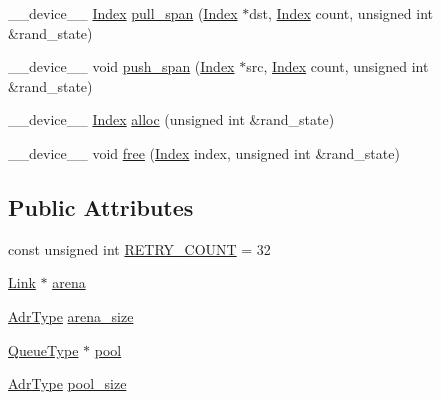 \begin{DoxyCompactItemize}
\-\_\-\-\_\-device\-\_\-\-\_\- \hyperlink{structMemPool_adf9fcd1cb44028899c45761a29b7d43f}{Index} \hyperlink{structMemPool_ac8e3fca0c4657642e06cba7e393c7be7}{pull\-\_\-span} (\hyperlink{structMemPool_adf9fcd1cb44028899c45761a29b7d43f}{Index} $\ast$dst, \hyperlink{structMemPool_adf9fcd1cb44028899c45761a29b7d43f}{Index} count, unsigned int \&rand\-\_\-state)
\item 
\-\_\-\-\_\-device\-\_\-\-\_\- void \hyperlink{structMemPool_acf1f6f80c1f7ebb2b50bb9d4af619abb}{push\-\_\-span} (\hyperlink{structMemPool_adf9fcd1cb44028899c45761a29b7d43f}{Index} $\ast$src, \hyperlink{structMemPool_adf9fcd1cb44028899c45761a29b7d43f}{Index} count, unsigned int \&rand\-\_\-state)
\item 
\-\_\-\-\_\-device\-\_\-\-\_\- \hyperlink{structMemPool_adf9fcd1cb44028899c45761a29b7d43f}{Index} \hyperlink{structMemPool_a1f02b879780bf1dff7ab3b86263824d4}{alloc} (unsigned int \&rand\-\_\-state)
\item 
\-\_\-\-\_\-device\-\_\-\-\_\- void \hyperlink{structMemPool_aca9a7fd23bcb95c111267683ffb17b35}{free} (\hyperlink{structMemPool_adf9fcd1cb44028899c45761a29b7d43f}{Index} index, unsigned int \&rand\-\_\-state)
\end{DoxyCompactItemize}
\subsection*{Public Attributes}
\begin{DoxyCompactItemize}
\item 
const unsigned int \hyperlink{structMemPool_a9f0113977dc6ebc1f99aeac36455d49d}{R\-E\-T\-R\-Y\-\_\-\-C\-O\-U\-N\-T} = 32
\item 
\hyperlink{unionMemPool_1_1Link}{Link} $\ast$ \hyperlink{structMemPool_affe7fe7c80536562358f79d4ff41a92b}{arena}
\item 
\hyperlink{structMemPool_a62addfe04ad9f092442cf86863f52fcc}{Adr\-Type} \hyperlink{structMemPool_a3bfcf6da58b80b102be1ec4f4f5b424a}{arena\-\_\-size}
\item 
\hyperlink{structMemPool_a6044c1fc80a16b30462127a56e47ab98}{Queue\-Type} $\ast$ \hyperlink{structMemPool_a50e7e330c2733a1ed0fc48d090c8d7e7}{pool}
\item 
\hyperlink{structMemPool_a62addfe04ad9f092442cf86863f52fcc}{Adr\-Type} \hyperlink{structMemPool_a7d96890dc6b226996b58974a633cea75}{pool\-\_\-size}
\end{DoxyCompactItemize}


